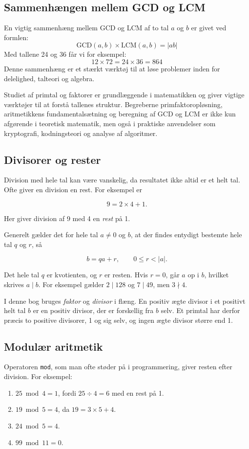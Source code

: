 \subsection*{Sammenhængen mellem GCD og LCM}

En vigtig sammenhæng mellem GCD og LCM af to tal \(a\) og \(b\) er givet ved formlen:
\[
\text{GCD}(a, b) \times \text{LCM}(a, b) = |a b|
\]
Med tallene 24 og 36 får vi for eksempel:
\[
12 \times 72 = 24 \times 36 = 864
\]
Denne sammenhæng er et stærkt værktøj til at løse problemer inden for delelighed, talteori og algebra.

Studiet af primtal og faktorer er grundlæggende i matematikken og giver vigtige værktøjer til at forstå tallenes struktur. Begreberne primfaktoropløsning, aritmetikkens fundamentalsætning og beregning af GCD og LCM er ikke kun afgørende i teoretisk matematik, men også i praktiske anvendelser som kryptografi, kodningsteori og analyse af algoritmer.

\subsection*{Divisorer og rester}
\label{sec:2.3Mod}
Division med hele tal kan være vanskelig, da resultatet ikke altid er et helt tal. Ofte giver en division en rest. For eksempel er

\[
9 = 2 \times 4 + 1.
\]

Her giver division af 9 med 4 en \textit{rest} på 1.

Generelt gælder det for hele tal \(a\neq0\) og \(b\), at der findes entydigt bestemte hele tal $q$ og $r$, så

\[
b = q a + r, \qquad 0\leq r<|a|.
\]

Det hele tal $q$ er kvotienten, og \(r\) er resten. Hvis \(r=0\), går \(a\) op i \(b\), hvilket skrives \(a \mid b\). For eksempel gælder \(2 \mid 128\) og \(7 \mid 49\), men \(3 \nmid 4\).

I denne bog bruges \emph{faktor} og \emph{divisor} i flæng. En positiv ægte divisor i et positivt helt tal $b$ er en positiv divisor, der er forskellig fra $b$ selv. Et primtal har derfor præcis to positive divisorer, 1 og sig selv, og ingen ægte divisor større end 1.

\subsection*{Modulær aritmetik}
Operatoren \texttt{mod}, som man ofte støder på i programmering, giver resten efter division. For eksempel:
\begin{enumerate}
    \item \(25 \bmod 4 = 1\), fordi \(25 \div 4 = 6\) med en rest på 1.
    \item \(19 \bmod 5 = 4\), da \(19 = 3 \times 5 + 4\).
    \item \(24 \bmod 5 = 4\).
    \item \(99 \bmod 11 = 0\).
\end{enumerate}

